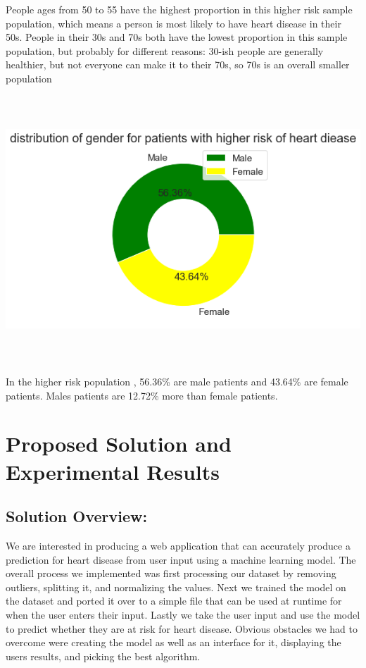 \documentclass[12pt]{article}
\begin{document}
People ages from 50 to 55 have the highest proportion in this higher risk sample population, which means a person is most likely to have heart disease in their 50s. People in their 30s and 70s both have the lowest proportion in this sample population, but probably for different reasons: 30-ish people are generally healthier, but not everyone can make it to their 70s, so 70s is an overall smaller population 
\begin{center}
    \includegraphics[width=\textwidth, height=10cm, keepaspectratio]{images/image1.png}    
\end{center}
In the higher risk population , 56.36\%  are male patients and  43.64\% are female patients. Males patients are 12.72\% more than female patients. 

\section*{Proposed Solution and Experimental Results}
\subsection*{Solution Overview:}
\hspace{\parindent}We are interested in producing a web application that can accurately produce a prediction for heart disease from user input using a machine learning model. The overall process we implemented was first processing our dataset by removing outliers, splitting it, and normalizing the values. Next we trained the model on the dataset and ported it over to a simple file that can be used at runtime for when the user enters their input. Lastly we take the user input and use the model to predict whether they are at risk for heart disease. Obvious obstacles we had to overcome were creating the model as well as an interface for it, displaying the users results, and picking the best algorithm. 
\end{document}
